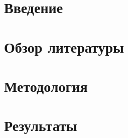 \documentclass[14pt,a4paper]{extreport}
\begin{document}

\tableofcontents
\clearpage

\chapter*{Введение}



\chapter{Обзор литературы}



\chapter{Методология}



\chapter{Результаты}





\renewcommand{\bibname}{Список литературы}




% 
\end{document}
